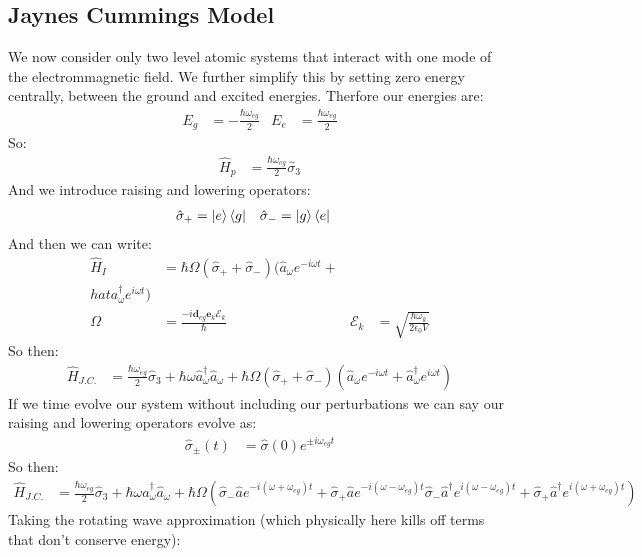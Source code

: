 \subsection{Jaynes Cummings Model}
We now consider only two level atomic systems that interact with one mode of the electrommagnetic field.
We further simplify this by setting zero energy centrally, between the ground and excited energies. Therfore our energies are:
\begin{align*}
	E_g &= -\frac{\hbar\omega_{eg}}{2} & E_e &= \frac{\hbar\omega_{eg}}{2}
\end{align*}
So:
\begin{align*}
	\hat{H}_p &= \frac{\hbar\omega_{eg}}{2}\hat{\sigma}_3
\end{align*}
And we introduce raising and lowering operators:
\begin{align*}
	\hat{\sigma}_+ &= \ket{e}\bra{g} & \hat{\sigma}_- &= \ket{g}\bra{e}
\end{align*}
And then we can write:
\begin{align*}
	\hat{H}_I &= \hbar\Omega(\hat{\sigma}_+ +\hat{\sigma}_-)(\hat{a}_\omega e^{-i\omega t} + \\hat{a}_\omega^\dagger e^{i\omega t}) \\
	\Omega &= \frac{-i\bm{d}_{eg} \bm{e}_k \mathcal{E}_k}{\hbar} & \mathcal{E}_k &= \sqrt{\frac{\hbar\omega_k}{2\epsilon_0 V}}
\end{align*}
So then:
\begin{align*}
	\hat{H}_{J.C.} &= \frac{\hbar\omega_{eg}}{2} \hat{\sigma}_3 + \hbar\omega\hat{a}_\omega^\dagger\hat{a}_\omega + \hbar\Omega(\hat{\sigma}_+ + \hat{\sigma}_-)(\hat{a}_\omega e^{-i\omega t} + \hat{a}_\omega^\dagger e^{i\omega t})
\end{align*}
If we time evolve our system without including our perturbations we can say our raising and lowering operators evolve as:
\begin{align*}
	\hat{\sigma}_\pm(t) &= \hat{\sigma}(0) e^{\pm i\omega_{eg} t}
\end{align*}
So then:
\begin{align*}
	\hat{H}_{J.C.} &= \frac{\hbar\omega_{eg}}{2} \hat{\sigma}_3 + \hbar\omega\hat{a}_\omega^\dagger\hat{a}_\omega + \hbar\Omega\left(\hat{\sigma}_- \hat{a}e^{-i(\omega + \omega_{eg})t} + \hat{\sigma}_+\hat{a} e^{-i(\omega - \omega_{eg})t}
		\hat{\sigma}_-\hat{a}^\dagger e^{i(\omega - \omega_{eg})t} + \hat{\sigma}_+\hat{a}^\dagger e^{i(\omega + \omega_{eg})t}\right)
\end{align*}
Taking the rotating wave approximation (which physically here kills off terms that don't conserve energy):
